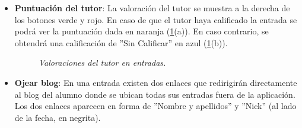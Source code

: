 \documentclass[a4paper, 12pt]{book}
\begin{document}
\begin{itemize}
  Si ese comentario es eliminado, el usuario obtendr\'a una penalizaci\'on de tres \textit{planets}.
  
  \item {\bfseries Puntuaci\'on del tutor}: La valoraci\'on del tutor se muestra a la derecha de los botones verde y rojo. En caso de que el tutor haya
  calificado la entrada se podr\'a ver la puntuaci\'on dada en naranja (\ref{figura:hiloalumno7}(a)). En caso contrario, se obtendr\'a una calificaci\'on de 
  ''Sin Calificar'' en azul (\ref{figura:hiloalumno7}(b)).
  \begin{figure}
    \centering
    \caption{\textit{Valoraciones del tutor en entradas.}}
    \label{figura:hiloalumno7}
  \end{figure}
  
  \item {\bfseries Ojear blog}: En una entrada existen dos enlaces que redirigir\'an directamente al blog del alumno donde se ubican todas sus entradas 
  fuera de la aplicaci\'on. Los dos enlaces aparecen en forma de ''Nombre y apellidos'' y ''Nick'' (al lado de la fecha, en negrita).
  

\end{itemize}
\end{document}
